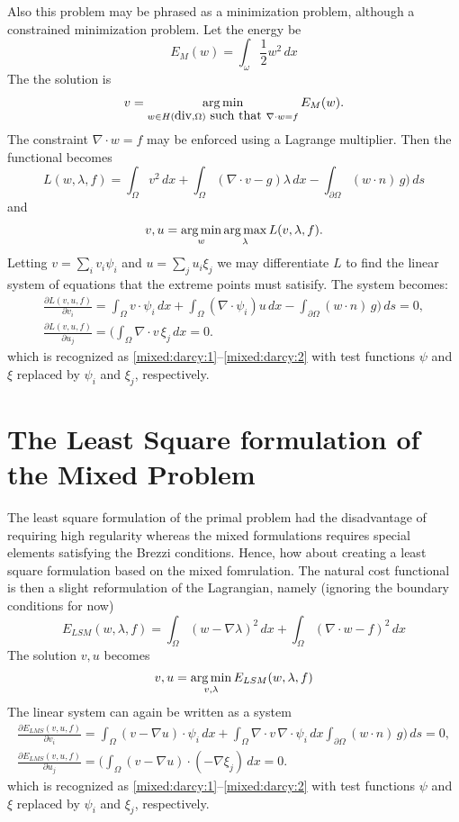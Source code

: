 Also this problem may be phrased as a minimization problem, although a constrained minimization problem. 
Let the energy be 
\[
E_{M}(w) = \int_\omega \frac{1}{2} w^2 \, dx  
\]
The the solution is  
\begin{align}
v = \operatorname*{arg\,min}_{w \in H(\mbox{div}, \Omega) \mbox{ such that }  \nabla \cdot w = f  } E_{M} (w) .   
\end{align}
The constraint $\nabla \cdot w = f$ may be enforced using a Lagrange multiplier. Then the functional
becomes  
\[
L(w,\lambda, f) = \int_\Omega v^2 \, dx + \int_\Omega (\nabla \cdot v - g) \lambda  \, dx - \int_{\partial \Omega} (w\cdot n) \,  g)  \, ds   
\]
and 
\begin{align}
v, u = \operatorname*{arg\,min}_{w} \operatorname*{arg\,max}_{\lambda} L(v, \lambda, f) .   
\end{align}
Letting  $v = \sum_i v_i \psi_i$    and $u = \sum_j u_i \xi_j$ we may differentiate $L$ to find the 
linear system of equations that the extreme points must satisify.     
The system becomes:  
\begin{align}
 \frac{\partial L (v, u, f)}{ \partial v_i} =  \int_\Omega v \cdot \psi_i \, dx + \int_\Omega (\nabla \cdot \psi_i ) u \, dx  -  
 \int_{\partial \Omega} (w\cdot n) \,  g)  \, ds = 0, \\    
 \frac{\partial L (v, u, f)}{ \partial u_j} = ( \int_\Omega \nabla \cdot v \,   \xi_j \, dx  = 0 .    
\end{align}
which is recognized as 
\eqref{mixed:darcy:1}--\eqref{mixed:darcy:2} with test functions $\psi$ and $\xi$ replaced by  $\psi_i$ and $\xi_j$, respectively.  


\section{The Least Square formulation of the Mixed Problem}
The least square formulation of the primal problem had the disadvantage of requiring high regularity whereas
the mixed formulations requires special elements satisfying the Brezzi conditions. Hence, how about
creating a least square formulation based on the mixed fomrulation. The natural cost functional is then 
a slight reformulation of the Lagrangian, namely (ignoring the boundary conditions for now)    
\[
E_{LSM}(w,\lambda, f) = \int_\Omega (w-\nabla \lambda)^2 \, dx + \int_\Omega (\nabla \cdot w - f)^2   \, dx    
\]
The solution $v, u$ becomes  
\[
v, u = \operatorname*{arg\,min}_{v, \lambda} E_{LSM}(w,\lambda, f) 
\]
The linear system can again be written as a system  
\begin{align}
 \frac{\partial E_{LMS} (v, u, f)}{ \partial v_i} =  \int_\Omega (v - \nabla u) \cdot \psi_i \, dx + \int_\Omega \nabla \cdot v \,  \nabla \cdot \psi_i  \, dx    
 \int_{\partial \Omega} (w\cdot n) \,  g)  \, ds = 0, \\    
 \frac{\partial E_{LMS} (v, u, f)}{ \partial u_j} = ( \int_\Omega (v - \nabla  u)\cdot(-\nabla \xi_j) \, dx  = 0 .    
\end{align}
which is recognized as 
\eqref{mixed:darcy:1}--\eqref{mixed:darcy:2} with test functions $\psi$ and $\xi$ replaced by  $\psi_i$ and $\xi_j$, respectively.  


 
